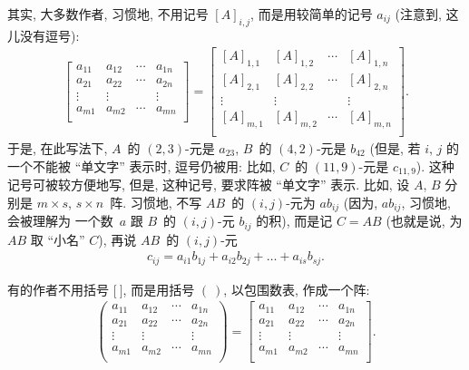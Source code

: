 其实,
大多数作者,
习惯地,
不用记号 \([A]_{i,j}\),
而是用较简单的记号 \(a_{ij}\)
(注意到, 这儿没有逗号):
\begin{align*}
    \begin{bmatrix}
        a_{11} & a_{12} & \cdots & a_{1n} \\
        a_{21} & a_{22} & \cdots & a_{2n} \\
        \vdots & \vdots & {}     & \vdots \\
        a_{m1} & a_{m2} & \cdots & a_{mn} \\
    \end{bmatrix}
    =
    \begin{bmatrix}
        [A]_{1,1} & [A]_{1,2} & \cdots & [A]_{1,n} \\
        [A]_{2,1} & [A]_{2,2} & \cdots & [A]_{2,n} \\
        \vdots    & \vdots    & {}     & \vdots    \\
        [A]_{m,1} & [A]_{m,2} & \cdots & [A]_{m,n} \\
    \end{bmatrix}.
\end{align*}
于是, 在此写法下,
\(A\)~的 \((2, 3)\)-元是 \(a_{23}\),
\(B\)~的 \((4, 2)\)-元是 \(b_{42}\)
(但是, 若 \(i\), \(j\) 的一个不能被 ``单文字'' 表示时,
逗号仍被用:
比如, \(C\)~的 \((11, 9)\)-元是 \(c_{11,9}\)).
这种记号可被较方便地写,
但是, 这种记号, 要求阵被 ``单文字'' 表示.
比如, 设 \(A\), \(B\) 分别是
\(m \times s\), \(s \times n\)~阵.
习惯地, 不写 \(AB\)~的 \((i, j)\)-元为
\({ab}_{ij}\)
(因为, \({ab}_{ij}\),
习惯地,
会被理解为%
一个数~\(a\) 跟
\(B\)~的 \((i, j)\)-元 \(b_{ij}\)
的积),
而是记 \(C = AB\)
(也就是说, 为 \(AB\) 取 ``小名'' \(C\)),
再说 \(AB\)~的 \((i, j)\)-元
\begin{align*}
    c_{ij}
    = a_{i1} b_{1j} + a_{i2} b_{2j} + \dots
    + a_{is} b_{sj}.
\end{align*}

有的作者不用括号 \({[} \ {]}\),
而是用括号 \(( \ )\),
以包围数表, 作成一个阵:
\begin{align*}
    \begin{pmatrix}
        a_{11} & a_{12} & \cdots & a_{1n} \\
        a_{21} & a_{22} & \cdots & a_{2n} \\
        \vdots & \vdots & {}     & \vdots \\
        a_{m1} & a_{m2} & \cdots & a_{mn} \\
    \end{pmatrix}
    =
    \begin{bmatrix}
        a_{11} & a_{12} & \cdots & a_{1n} \\
        a_{21} & a_{22} & \cdots & a_{2n} \\
        \vdots & \vdots & {}     & \vdots \\
        a_{m1} & a_{m2} & \cdots & a_{mn} \\
    \end{bmatrix}.
\end{align*}

